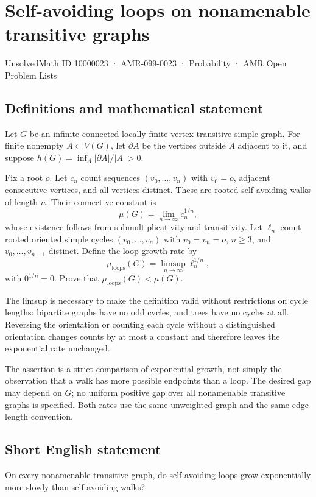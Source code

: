 \documentclass[11pt,a4paper]{article}
\begin{document}
\section*{Self-avoiding loops on nonamenable transitive graphs}\label{10000023}
{\small UnsolvedMath ID 10000023 · AMR-099-0023 · Probability · AMR Open Problem Lists}
\subsection{Definitions and mathematical statement}
Let $G$ be an infinite connected locally finite vertex-transitive simple graph. For finite nonempty $A\subset V(G)$, let $\partial A$ be the vertices outside $A$ adjacent to it, and suppose $h(G)=\inf_A|\partial A|/|A|>0$.

Fix a root $o$. Let $c_n$ count sequences $(v_0,\ldots,v_n)$ with $v_0=o$, adjacent consecutive vertices, and all vertices distinct. These are rooted self-avoiding walks of length $n$. Their connective constant is
\[
\mu(G)=\lim_{n\to\infty}c_n^{1/n},
\]
whose existence follows from submultiplicativity and transitivity. Let $\ell_n$ count rooted oriented simple cycles $(v_0,\ldots,v_n)$ with $v_0=v_n=o$, $n\ge3$, and $v_0,\ldots,v_{n-1}$ distinct. Define the loop growth rate by
\[
\mu_{\mathrm{loops}}(G)=\limsup_{n\to\infty}\ell_n^{1/n},
\]
with $0^{1/n}=0$. Prove that $\mu_{\mathrm{loops}}(G)<\mu(G)$.

The limsup is necessary to make the definition valid without restrictions on cycle lengths: bipartite graphs have no odd cycles, and trees have no cycles at all. Reversing the orientation or counting each cycle without a distinguished orientation changes counts by at most a constant and therefore leaves the exponential rate unchanged.

The assertion is a strict comparison of exponential growth, not simply the observation that a walk has more possible endpoints than a loop. The desired gap may depend on $G$; no uniform positive gap over all nonamenable transitive graphs is specified. Both rates use the same unweighted graph and the same edge-length convention.
\subsection{Short English statement}
On every nonamenable transitive graph, do self-avoiding loops grow exponentially more slowly than self-avoiding walks?
\end{document}
